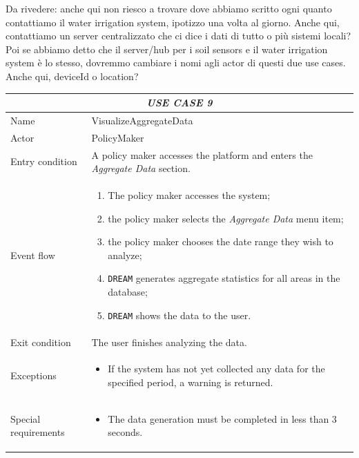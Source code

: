 \documentclass{article}
\begin{document}
\color{red}
Da rivedere: anche qui non riesco a trovare dove abbiamo scritto ogni quanto contattiamo il water irrigation system, ipotizzo una volta al giorno. Anche qui, contattiamo un server centralizzato che ci dice i dati di tutto o più sistemi locali? Poi se abbiamo detto che il server/hub per i soil sensors e il water irrigation system è lo stesso, dovremmo cambiare i nomi agli actor di questi due use cases. Anche qui, deviceId o location?
\color{black}


\centering
\begin{longtable}{|p{3.5cm}|m{8cm}|}
 \hline
 \multicolumn{2}{|c|}{\cellcolor{white}\emph{USE CASE 9}} \\
 \endfirsthead
 \endhead
 \endfoot
 \endlastfoot
 \hline
 Name & VisualizeAggregateData\\
 \hline
 Actor & PolicyMaker\\
 \hline
 Entry condition & A policy maker accesses the platform and enters the \emph{Aggregate Data} section.\\
 \hline
 Event flow & \begin{enumerate}
    \item The policy maker accesses the system;
    \item the policy maker selects the \emph{Aggregate Data} menu item;
    \item the policy maker chooses the date range they wish to analyze;
    \item \verb|DREAM| generates aggregate statistics for all areas in the database;
    \item \verb|DREAM| shows the data to the user.
 \end{enumerate}\\
 \hline
 Exit condition & The user finishes analyzing the data.\\
 \hline
 Exceptions & \begin{itemize}
     \item If the system has not yet collected any data for the specified period, a warning is returned.
 \end{itemize}\\
 \hline
 Special requirements &\begin{itemize}
     \item The data generation must be completed in less than 3 seconds.
 \end{itemize}\\
 \hline
\end{longtable}
\end{document}
